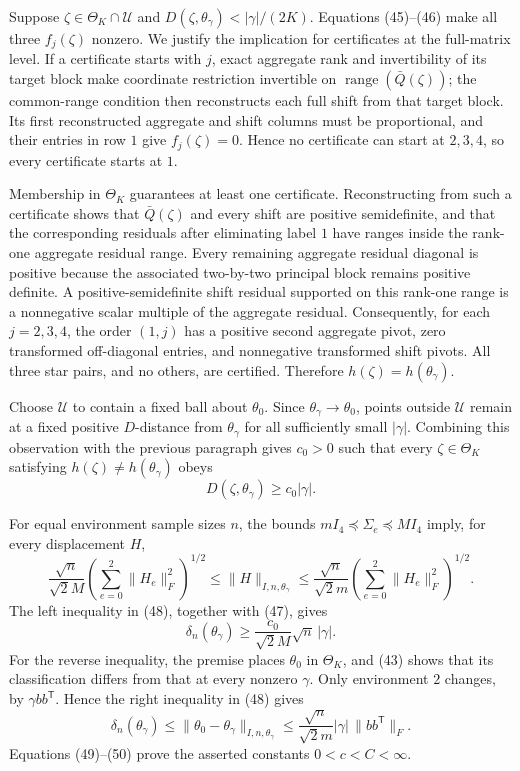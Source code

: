 Suppose \(\zeta\in\Theta_K\cap\mathcal U\) and \(D(\zeta,\theta_\gamma)<|\gamma|/(2K)\).  Equations (45)--(46) make all three \(f_j(\zeta)\) nonzero.  We justify the implication for certificates at the full-matrix level.  If a certificate starts with \(j\), exact aggregate rank and invertibility of its target block make coordinate restriction invertible on \(\operatorname{range}(\bar Q(\zeta))\); the common-range condition then reconstructs each full shift from that target block.  Its first reconstructed aggregate and shift columns must be proportional, and their entries in row \(1\) give \(f_j(\zeta)=0\).  Hence no certificate can start at \(2,3,4\), so every certificate starts at \(1\).

Membership in \(\Theta_K\) guarantees at least one certificate.  Reconstructing from such a certificate shows that \(\bar Q(\zeta)\) and every shift are positive semidefinite, and that the corresponding residuals after eliminating label \(1\) have ranges inside the rank-one aggregate residual range.  Every remaining aggregate residual diagonal is positive because the associated two-by-two principal block remains positive definite.  A positive-semidefinite shift residual supported on this rank-one range is a nonnegative scalar multiple of the aggregate residual.  Consequently, for each \(j=2,3,4\), the order \((1,j)\) has a positive second aggregate pivot, zero transformed off-diagonal entries, and nonnegative transformed shift pivots.  All three star pairs, and no others, are certified.  Therefore \(h(\zeta)=h(\theta_\gamma)\).

Choose \(\mathcal U\) to contain a fixed ball about \(\theta_0\).  Since \(\theta_\gamma\to\theta_0\), points outside \(\mathcal U\) remain at a fixed positive \(D\)-distance from \(\theta_\gamma\) for all sufficiently small \(|\gamma|\).  Combining this observation with the previous paragraph gives \(c_0>0\) such that every \(\zeta\in\Theta_K\) satisfying \(h(\zeta)\ne h(\theta_\gamma)\) obeys
\[
 D(\zeta,\theta_\gamma)\ge c_0|\gamma|. \tag{47}
\]

For equal environment sample sizes \(n\), the bounds \(mI_4\preceq\Sigma_e\preceq MI_4\) imply, for every displacement \(H\),
\[
 \frac{\sqrt n}{\sqrt2M}\left(\sum_{e=0}^2\lVert H_e\rVert_F^2\right)^{1/2}
 \le\lVert H\rVert_{I,n,\theta_\gamma}
 \le\frac{\sqrt n}{\sqrt2m}\left(\sum_{e=0}^2\lVert H_e\rVert_F^2\right)^{1/2}. \tag{48}
\]
The left inequality in (48), together with (47), gives
\[
 \delta_n(\theta_\gamma)\ge\frac{c_0}{\sqrt2M}\sqrt n\,|\gamma|. \tag{49}
\]
For the reverse inequality, the premise places \(\theta_0\) in \(\Theta_K\), and (43) shows that its classification differs from that at every nonzero \(\gamma\).  Only environment \(2\) changes, by \(\gamma bb^{\mathsf T}\).  Hence the right inequality in (48) gives
\[
 \delta_n(\theta_\gamma)
 \le\lVert\theta_0-\theta_\gamma\rVert_{I,n,\theta_\gamma}
 \le\frac{\sqrt n}{\sqrt2m}|\gamma|\,\lVert bb^{\mathsf T}\rVert_F. \tag{50}
\]
Equations (49)--(50) prove the asserted constants \(0<c<C<\infty\).


